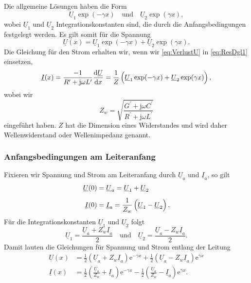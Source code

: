 \documentclass[paper=a4, parskip=half-, ngerman, fontsize=11pt]{scrreprt}
\begin{document}
Die allgemeine Lösungen haben die Form
\[ \underline{U}_{1} \exp(- \gamma x) \quad \text{und} \quad \underline{U}_{2} \exp(\gamma x), \] wobei
$\underline{U}_{1}$ und $\underline{U}_{2}$ Integrationskonstanten sind, die durch die Anfangsbedingungen festgelegt
werden.
Es gilt somit für die Spannung
\begin{equation}
    \underline{U}(x) = \underline{U}_{1} \exp(- \gamma x) + \underline{U}_{2} \exp(\gamma x) \label{eq:VerlustU}.
\end{equation}
Die Gleichung für den Strom erhalten wir, wenn wir \eqref{eq:VerlustU} in \eqref{eq:ResDgl1} einsetzen,
\begin{equation}
    \underline{I}(x) = \frac{-1}{R^{\prime} + \mathrm{j} \omega L^{\prime}} \frac{\text{d} \underline{U}}{\text{d} x}
    = \frac{1}{Z}
    \left(
    \vphantom{\sqrt{1}{Z}}
    \underline{U}_{1} \exp(- \gamma x) + \underline{U}_{2} \exp(\gamma x) \right),
\end{equation}
wobei wir
\begin{equation}
    Z_{w} = \sqrt{\frac{G^{\prime} + \mathrm{j} \omega C^{\prime}}{R^{\prime} + \mathrm{j} \omega L^{\prime}}}
    \label{eq:Zw}
\end{equation}
eingeführt haben. $Z$ hat die Dimension eines Widerstandes und wird daher Wellenwiderstand oder Wellenimpedanz
genannt.

\subsubsection{Anfangsbedingungen am Leiteranfang}

Fixieren wir Spannung und Strom am Leiteranfang durch $\underline{U}_{a}$ und $\underline{I}_{a}$, so gilt
\begin{align*}
    \underline{U}(0) &= \underline{U}_{a} = \underline{U}_{1} + \underline{U}_{2} \\[1ex]
    \underline{I}(0) &= \underline{I}_{a} = \frac{1}{Z_{w}}
    \left(
    \vphantom{\sqrt{1}{Z_{w}}}
    \underline{U}_{1} - \underline{U}_{2} \right).
\end{align*}
Für die Integrationskonstanten $\underline{U}_{1}$ und $\underline{U}_{2}$ folgt
\[ \underline{U}_{1} = \frac{\underline{U}_{a} + Z_{w} \underline{I}_{a}}{2} \quad \text{und} \quad \underline{U}_{2} =
\frac{\underline{U}_{a} - Z_{w} \underline{I}_{a}}{2}. \]
Damit lauten die Gleichungen für Spannung und Strom entlang der Leitung
\begin{align}
    \underline{U}(x) &=
    \frac{1}{2} \left( \underline{U}_{a} + Z_{w} \underline{I}_{a} \right) \mathrm{e}^{- \gamma x}
    +
    \frac{1}{2} \left( \underline{U}_{a} - Z_{w} \underline{I}_{a} \right) \mathrm{e}^{\gamma x} \label{eq:UxA} \\[1ex]
    \underline{I}(x) &=
    \frac{1}{2} \left( \frac{\underline{U}_{a}}{Z_{w}} + \underline{I}_{a} \right) \mathrm{e}^{- \gamma x}
    -
    \frac{1}{2} \left( \frac{\underline{U}_{a}}{Z_{w}} - \underline{I}_{a} \right) \mathrm{e}^{\gamma x} \label{eq:IxA}
    .
\end{align}
\end{document}
